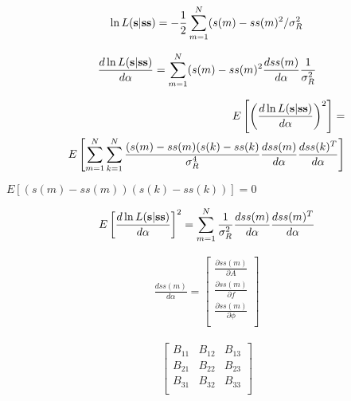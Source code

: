 \begin{center}
\begin{eqnarray}
	\label{eq:crlb3_likehood}
	\ln L({\bf s}|{\bf ss}) = -\frac{1}{2} \sum \limits_{m=1}^{N}(s(m)-ss(m)^2 / \sigma_R^2
\end{eqnarray}
\end{center}

\begin{center}
\begin{eqnarray}
	\frac{d \ln L({\bf s}|{\bf ss})}{d {\bf \alpha}} = \sum \limits_{m=1}^{N}(s(m)-ss(m)^2 \frac{d ss(m)}{d \alpha} \frac{1}{\sigma_R^2}
\end{eqnarray}
\end{center}

\begin{center}
\begin{eqnarray}
	E \left[ \left( \frac{d \ln L({\bf s}|{\bf ss})}{d {\bf \alpha}} \right)^2 \right] = \\
	E \left[ \sum \limits_{m=1}^{N}\sum \limits_{k=1}^{N} \frac{(s(m)-ss(m)(s(k)-ss(k)}{\sigma_R^4} \frac{d ss(m)}{d \alpha} \frac{d ss(k)^T}{d \alpha} \right]
\end{eqnarray}
\end{center}

${E[(s(m)-ss(m))(s(k)-ss(k))]=0}$

\begin{center}
\begin{eqnarray}
	E \left[  \frac{d \ln L({\bf s}|{\bf ss})}{d {\bf \alpha}} \right]^2 =
	\sum \limits_{m=1}^{N} \frac{1}{\sigma_R^2} \frac{d ss(m)}{d \alpha} \frac{d ss(m)^T}{d \alpha}
\end{eqnarray}
\end{center}


\begin{center}
\begin{eqnarray}
		\frac{d ss(m)}{d \alpha} = 
		\left[ \begin{array}{c}
		\frac{\partial ss(m)}{\partial A} \nonumber	\\
		\frac{\partial ss(m)}{\partial f} 		\\
		\frac{\partial ss(m)}{\partial \phi} \nonumber	\\
		\end{array} \right]
\end{eqnarray}
\end{center}

\begin{center}
\begin{eqnarray}
	\label{eq:crlb3_alpha}
		\left[ \begin{array}{ccc}
		B_{11} & B_{12} & B_{13}  \\
		B_{21} & B_{22} & B_{23}  \\
		B_{31} & B_{32} & B_{33}  \\
		\end{array} \right]
\end{eqnarray}
\end{center}

